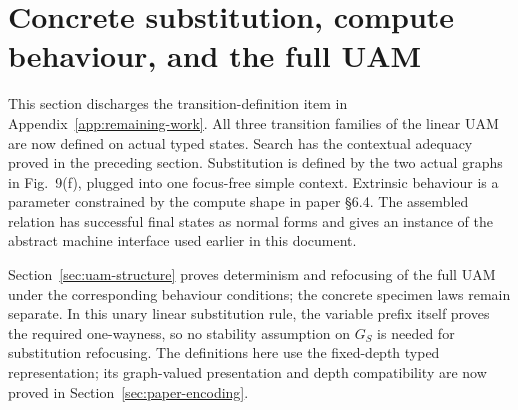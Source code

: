 \section{Concrete substitution, compute behaviour, and the full UAM}
\label{sec:full-uam}
This section discharges the transition-definition item in
Appendix~\ref{app:remaining-work}. All three transition families of the linear
UAM are now defined on actual typed states. Search has the contextual adequacy
proved in the preceding section. Substitution is defined by the two actual
graphs in Fig.~9(f), plugged into one focus-free simple context. Extrinsic
behaviour is a parameter constrained by the compute shape in paper \S6.4.
The assembled relation has successful final states as normal forms and gives
an instance of the abstract machine interface used earlier in this document.

Section~\ref{sec:uam-structure} proves determinism and refocusing of the full
UAM under the corresponding behaviour conditions; the concrete specimen laws
remain separate. In this unary linear substitution rule, the variable prefix
itself proves the required one-wayness, so no stability assumption on $G_S$
is needed for substitution refocusing. The definitions here use the fixed-depth typed
representation; its graph-valued presentation and depth compatibility are now
proved in Section~\ref{sec:paper-encoding}.

